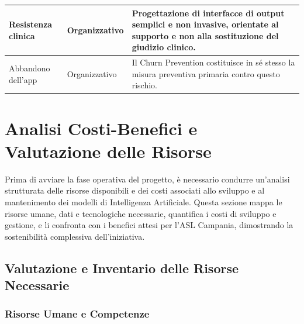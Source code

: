 \begin{table}[H]
\begin{tabular}{|p{}|p{}|p{}|}
        \hline
        Resistenza clinica         & Organizzativo      & Progettazione di interfacce di output semplici e non invasive, orientate al supporto e non alla sostituzione del giudizio clinico.                                                                                                                                                                                                                                                                                                         \\
        \hline
        Abbandono dell'app         & Organizzativo      & Il Churn Prevention costituisce in sé stesso la misura preventiva primaria contro questo rischio.                                                                                                                                                                                                                                                                                                                                          \\
        \hline
    \end{tabular}
\end{table}

\section{Analisi Costi-Benefici e Valutazione delle Risorse}
\label{sec:costi_benefici}

Prima di avviare la fase operativa del progetto, è necessario condurre un'analisi strutturata delle risorse disponibili e dei costi associati allo sviluppo e al mantenimento dei modelli di Intelligenza Artificiale. Questa sezione mappa le risorse umane, dati e tecnologiche necessarie, quantifica i costi di sviluppo e gestione, e li confronta con i benefici attesi per l'ASL Campania, dimostrando la sostenibilità complessiva dell'iniziativa.


\clearpage
\subsection{Valutazione e Inventario delle Risorse Necessarie}
\label{subsec:inventario_risorse}

\subsubsection{Risorse Umane e Competenze}
\label{subsubsec:risorse_umane}

